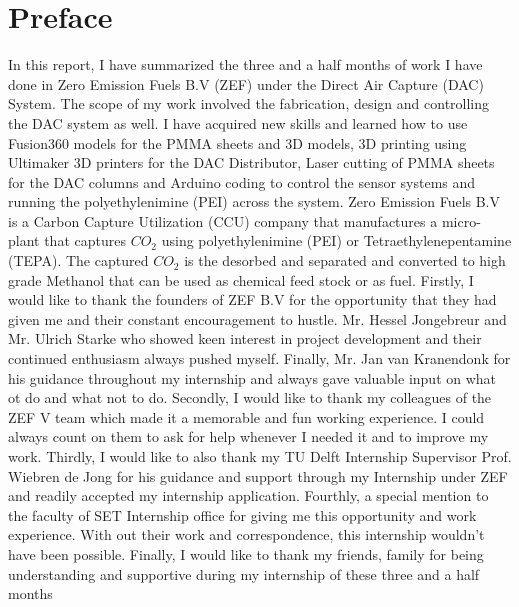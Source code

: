 \section*{Preface}

In this report, I have summarized the three and a half months of work I have done in Zero Emission Fuels B.V (ZEF) under the Direct Air Capture (DAC) System. The scope of my work involved the fabrication, design and controlling the DAC system as well. I have acquired new skills and learned how to use Fusion360 models for the PMMA sheets and 3D models, 3D printing using Ultimaker 3D printers for the DAC Distributor, Laser cutting of PMMA sheets for the DAC columns and Arduino coding to control the sensor systems and running the polyethylenimine (PEI) across the system. 
\bigbreak
\noindent
Zero Emission Fuels B.V is a Carbon Capture Utilization (CCU) company that manufactures a micro-plant that captures $CO_2$ using polyethylenimine (PEI) or Tetraethylenepentamine (TEPA). The captured $CO_2$ is the desorbed and separated and converted to high grade Methanol that can be used as chemical feed stock or as fuel. 
\bigbreak
\noindent
Firstly, I would like to thank the founders of ZEF B.V for the opportunity that they had given me and their constant encouragement to hustle. Mr. Hessel Jongebreur and Mr. Ulrich Starke who showed keen interest in project development and their continued enthusiasm always pushed myself. Finally, Mr. Jan van Kranendonk for his guidance throughout my internship and always gave valuable input on what ot do and what not to do. 
\bigbreak
\noindent
Secondly, I would like to thank my colleagues of the ZEF V team which made it a memorable and fun working experience. I could always count on them to ask for help whenever I needed it and to improve my work. 
\bigbreak
\noindent
Thirdly, I would like to also thank my TU Delft Internship Supervisor Prof. Wiebren de Jong for his guidance and support through my Internship under ZEF and readily accepted my internship application.  
\bigbreak
\noindent
Fourthly, a special mention to the faculty of SET Internship office for giving me this opportunity and work experience. With out their work and correspondence, this internship wouldn't have been possible. 
\bigbreak
\noindent
Finally, I would like to thank my friends, family for being understanding and supportive during my internship of these three and a half months
